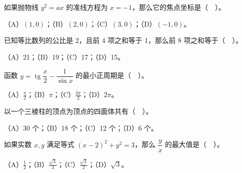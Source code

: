 \begin{question}
如果抛物线 $y^2=ax$ 的准线方程为 $x=-1$，那么它的焦点坐标是（　）。

（A）$(1,0)$；（B）$(2,0)$；（C）$(3,0)$；（D）$(-1,0)$。

\end{question}
\begin{question}
已知等比数列的公比是 2，且前 4 项之和等于 1，那么前 8 项之和等于（　）。

（A）21；（B）19；（C）17；（D）15。

\end{question}
\begin{question}
函数 $y=\operatorname{tg}\dfrac{x}{2}-\dfrac{1}{\sin x}$ 的最小正周期是（　）。

（A）$\frac{\pi}{2}$；（B）$\pi$；（C）$\frac{3\pi}{2}$；（D）$2\pi$。

\end{question}
\begin{question}
以一个三棱柱的顶点为顶点的四面体共有（　）。

（A）30 个；（B）18 个；（C）12 个；（D）6 个。

\end{question}
\begin{question}
如果实数 $x,y$ 满足等式 $(x-2)^2+y^2=3$，那么 $\dfrac{y}{x}$ 的最大值是（　）。

（A）$\frac12$；（B）$\frac{\sqrt3}{3}$；（C）$\frac{\sqrt3}{2}$；（D）$\sqrt3$。

\end{question}

